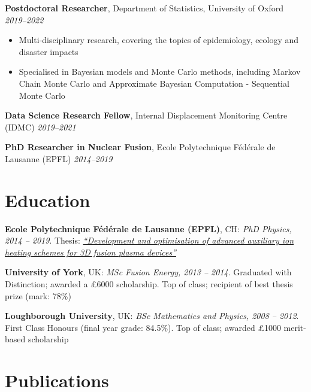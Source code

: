 \documentclass[a4paper,10pt]{article}
\begin{document}
\textbf{Postdoctoral Researcher}, Department of Statistics, University of Oxford \hfill \textit{2019–2022} 
\begin{itemize}[noitemsep]
  \item Multi-disciplinary research, covering the topics of epidemiology, ecology and disaster impacts
  \item Specialised in Bayesian models and Monte Carlo methods, including Markov Chain Monte Carlo and Approximate Bayesian Computation - Sequential Monte Carlo
\end{itemize}


\textbf{Data Science Research Fellow}, Internal Displacement Monitoring Centre (IDMC) \hfill \textit{2019–2021}


\textbf{PhD Researcher in Nuclear Fusion}, Ecole Polytechnique Fédérale de Lausanne (EPFL) \hfill \textit{2014–2019}


\section*{Education}

\textbf{Ecole Polytechnique Fédérale de Lausanne (EPFL)}, CH: \textit{PhD Physics, 2014 -- 2019}. Thesis: \href{https://www.google.com/url?sa=t&source=web&rct=j&opi=89978449&url=https://infoscience.epfl.ch/bitstreams/5babf910-f6b6-440f-a6b6-18fe337d0765/download&ved=2ahUKEwjkybTBpr6MAxUk0wIHHVGqJe4QFnoECBUQAQ&usg=AOvVaw1UCwZ1WpC_BD8WjKRfwaoY}{\textit{“Development and optimisation of advanced auxiliary ion heating
schemes for 3D fusion plasma devices”}}

\vspace{0.1cm}
\textbf{University of York}, UK: \textit{MSc Fusion Energy, 2013 -- 2014}. Graduated with Distinction; awarded a £6000 scholarship. Top of class; recipient of best thesis prize (mark: 78\%) 

\vspace{0.1cm}
\textbf{Loughborough University}, UK: \textit{BSc Mathematics and Physics, 2008 -- 2012}. First Class Honours (final year grade: 84.5\%). Top of class; awarded £1000 merit-based scholarship

\section*{Publications}
\end{document}
